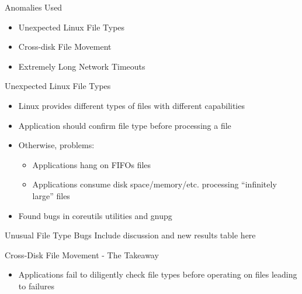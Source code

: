 \documentclass[pdf]{beamer}
\begin{document}
\begin{frame}{Anomalies Used}
  \begin{itemize}
  \item{Unexpected Linux File Types}
  \item{Cross-disk File Movement}
  \item{Extremely Long Network Timeouts}
  \end{itemize}
\end{frame}


\begin{frame}{Unexpected Linux File Types}
  \begin{itemize}
  \item{Linux provides different types of files with different capabilities}
  \item{Application should confirm file type before processing a file}
  \item{Otherwise, problems:}
    \begin{itemize}
    \item{Applications hang on FIFOs files}
    \item{Applications consume disk space/memory/etc. processing ``infinitely
        large'' files}
    \end{itemize}
  \item{Found bugs in coreutils utilities and gnupg}
  \end{itemize}
\end{frame}


\begin{frame}{Unusual File Type Bugs}
  Include discussion and new results table here
\end{frame}


\begin{frame}{Cross-Disk File Movement - The Takeaway}
  \begin{itemize}
    \item{Applications fail to diligently check file types before operating
      on files leading to failures}
  \end{itemize}
\end{frame}
\end{document}
